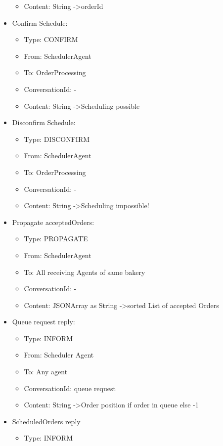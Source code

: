 \documentclass[10pt,a4paper]{article}
\begin{document}
\begin{itemize}
\begin{itemize}
			\item Content: String -\textgreater {orderId}
		\end{itemize}
		\item Confirm Schedule:
		\begin{itemize}
			\item Type: CONFIRM
			\item From: SchedulerAgent
			\item To: OrderProcessing
			\item ConversationId: -
			\item Content: String -\textgreater \glqq Scheduling possible\grqq
		\end{itemize}
		\item Disconfirm Schedule:
		\begin{itemize}
			\item Type: DISCONFIRM
			\item From: SchedulerAgent
			\item To: OrderProcessing
			\item ConversationId: -
			\item Content: String -\textgreater \glqq Scheduling impossible!\grqq
		\end{itemize}
		\item Propagate acceptedOrders:
		\begin{itemize}
			\item Type: PROPAGATE
			\item From: SchedulerAgent
			\item To: All receiving Agents of same bakery
			\item ConversationId: -
			\item Content: JSONArray as String -\textgreater sorted List of accepted Orders
		\end{itemize}
		\item Queue request reply:
		\begin{itemize}
			\item Type: INFORM
			\item From: Scheduler Agent
			\item To: Any agent
			\item ConversationId: \glqq queue request\grqq
			\item Content: String -\textgreater Order position if order in queue else -1
		\end{itemize}
		\item ScheduledOrders reply
		\begin{itemize}
			\item Type: INFORM

\end{itemize}
\end{itemize}
\end{document}
